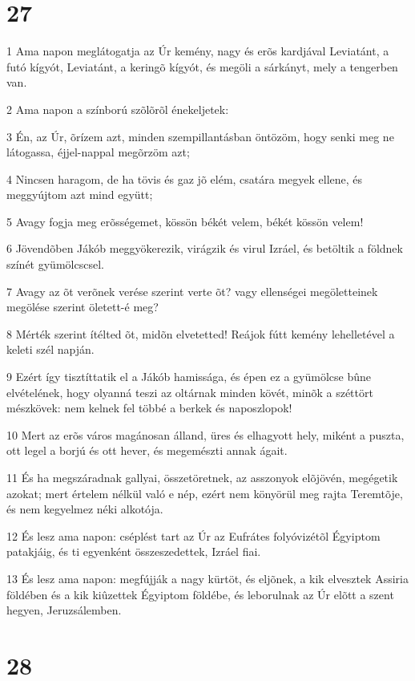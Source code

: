 \chapter{27}

\par 1 Ama napon meglátogatja az Úr kemény, nagy és erõs kardjával Leviatánt, a futó kígyót, Leviatánt, a keringõ kígyót, és megöli a sárkányt, mely a tengerben van.
\par 2 Ama napon a színború szõlõrõl énekeljetek:
\par 3 Én, az Úr, õrízem azt, minden szempillantásban öntözöm, hogy senki meg ne látogassa, éjjel-nappal megõrzöm azt;
\par 4 Nincsen haragom, de ha tövis és gaz jõ elém, csatára megyek ellene, és meggyújtom azt mind együtt;
\par 5 Avagy fogja meg erõsségemet, kössön békét velem, békét kössön velem!
\par 6 Jövendõben Jákób meggyökerezik, virágzik és virul Izráel, és betöltik a földnek színét gyümölcscsel.
\par 7 Avagy az õt verõnek verése szerint verte õt? vagy ellenségei megöletteinek megölése szerint öletett-é meg?
\par 8 Mérték szerint ítélted õt, midõn elvetetted! Reájok fútt kemény lehelletével a keleti szél napján.
\par 9 Ezért így tisztíttatik el a Jákób hamissága, és épen ez a gyümölcse bûne elvételének, hogy olyanná teszi az oltárnak minden kövét, minõk a széttört mészkövek: nem kelnek fel többé a berkek és naposzlopok!
\par 10 Mert az erõs város magánosan álland, üres és elhagyott hely, miként a puszta, ott legel a borjú és ott hever, és megemészti annak ágait.
\par 11 És ha megszáradnak gallyai, összetöretnek, az asszonyok elõjövén, megégetik azokat; mert értelem nélkül való e nép, ezért nem könyörül meg rajta Teremtõje, és nem kegyelmez néki alkotója.
\par 12 És lesz ama napon: cséplést tart az Úr az Eufrátes folyóvizétõl Égyiptom patakjáig, és ti egyenként összeszedettek, Izráel fiai.
\par 13 És lesz ama napon: megfújják a nagy kürtöt, és eljõnek, a kik elvesztek Assiria földében és a kik kiûzettek Égyiptom földébe, és leborulnak az Úr elõtt a szent hegyen, Jeruzsálemben.

\chapter{28}

